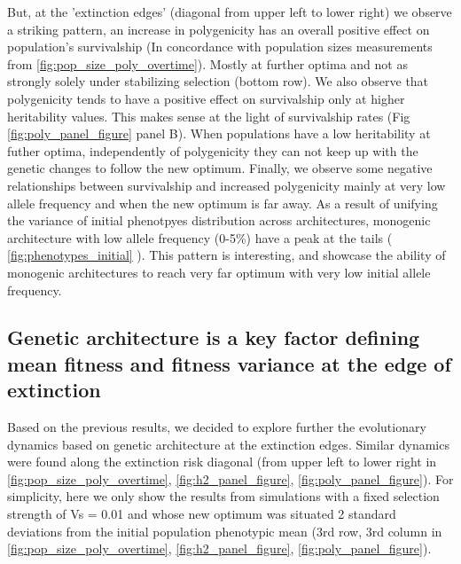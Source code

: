 \documentclass{article}
\begin{document}
But, at the 'extinction edges' (diagonal from upper left to lower right) we observe a striking pattern, an increase in polygenicity has an overall positive effect on population's survivalship (In concordance with population sizes measurements from \ref{fig:pop_size_poly_overtime}). Mostly at further optima and not as strongly solely under stabilizing selection (bottom row). We also observe that polygenicity tends to have a positive effect on survivalship only at higher heritability values. This makes sense at the light of survivalship rates (Fig \ref{fig:poly_panel_figure} panel B). When populations have a low heritability at futher optima, independently of polygenicity they can not keep up with the genetic changes to follow the new optimum. Finally, we observe some negative relationships between survivalship and increased polygenicity mainly at very low allele frequency and when the new optimum is far away. As a result of unifying the variance of initial phenotpyes distribution across architectures, monogenic architecture with low allele frequency (0-5\%) have a peak at the tails ( \ref{fig:phenotypes_initial} ). This pattern is interesting, and showcase the ability of monogenic architectures to reach very far optimum with very low initial allele frequency. 

\subsection{Genetic architecture is a key factor defining mean fitness and fitness variance at the edge of extinction}
Based on the previous results, we decided to explore further the evolutionary dynamics based on genetic architecture at the extinction edges. Similar dynamics were found along the extinction risk diagonal (from upper left to lower right in \ref{fig:pop_size_poly_overtime}, \ref{fig:h2_panel_figure}, \ref{fig:poly_panel_figure}). For simplicity, here we only show the results from simulations with a fixed selection strength of Vs = 0.01 and whose new optimum was situated 2 standard deviations from the initial population phenotypic mean (3rd row, 3rd column in \ref{fig:pop_size_poly_overtime}, \ref{fig:h2_panel_figure}, \ref{fig:poly_panel_figure}).
\end{document}
